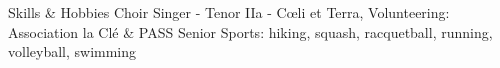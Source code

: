 \documentclass{resume}
\begin{document}
%

\vspace{-0.5cm}
\begin{category}{Skills \& Hobbies}
\setlength\itemsep{0.1em}
\citembullet Choir Singer - Tenor IIa - C\oe li et Terra, Volunteering: Association la Cl\' e \& 
PASS Senior
\citembullet Sports: hiking, squash, racquetball, running, volleyball, swimming
\end{category}


\end{document}
